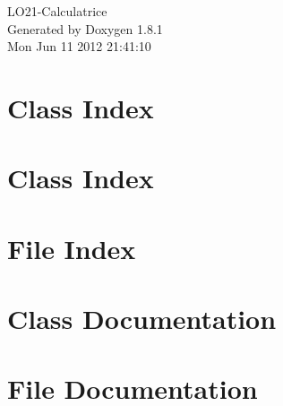 \documentclass{book}
\begin{document}
\hypersetup{pageanchor=false,citecolor=blue}
\begin{titlepage}
\vspace*{7cm}
\begin{center}
{\Large L\-O21-\/\-Calculatrice }\\
\vspace*{1cm}
{\large Generated by Doxygen 1.8.1}\\
\vspace*{0.5cm}
{\small Mon Jun 11 2012 21:41:10}\\
\end{center}
\end{titlepage}
\clearemptydoublepage
{}
\tableofcontents
\clearemptydoublepage
{}
\hypersetup{pageanchor=true,citecolor=blue}
\chapter{Class Index}

\chapter{Class Index}

\chapter{File Index}

\chapter{Class Documentation}















\chapter{File Documentation}














\printindex
\end{document}
